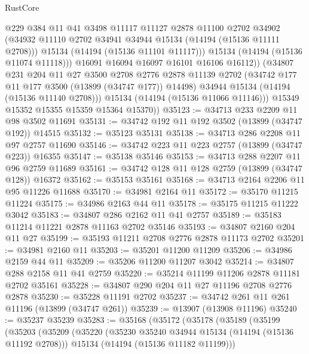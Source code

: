 \begin{lexlean}{RustCore}
\begin{coremodule}
                  @229
                  @384
                  @11
                  @41
                  @3498
                  @11117
                  @11127
                  @2878
                  @11100
                  @2702
                  @34902
                  (@34932 @11110 @2702 @34941 @34944 @15134 (@14194 (@15136 @11111 @2708)))
                  @15134
                  (@14194 (@15136 @11101 @11117)))
                @15134
                (@14194 (@15136 @11074 @11118)))
              @16091
              @16094
              @16097
              @16101
              @16106
              @16112))
          (@34807
            @231
            @204
            @11
            @27
            @3500
            @2708
            @2776
            @2878
            @11139
            @2702
            (@34742 @177 @11 @177 @3500 (@13899 (@34747 @177)) @14498)
            @34944
            @15134
            (@14194 (@15136 @11140 @2708)))
          @15134
          (@14194 (@15136 @11066 @11146)))
        @15349
        @15352
        @15355
        @15359
        @15364
        @15370))
@35123 := @34713 @233 @2209 @11 @98 @3502 @11691
@35131 := @34742 @192 @11 @192 @3502 (@13899 (@34747 @192)) @14515
@35132 := @35123 @35131
@35138 := @34713 @286 @2208 @11 @97 @2757 @11690
@35146 := @34742 @223 @11 @223 @2757 (@13899 (@34747 @223)) @16355
@35147 := @35138 @35146
@35153 := @34713 @288 @2207 @11 @96 @2759 @11689
@35161 := @34742 @128 @11 @128 @2759 (@13899 (@34747 @128)) @16372
@35162 := @35153 @35161
@35168 := @34713 @2164 @2206 @11 @95 @11226 @11688
@35170 := @34981 @2164 @11
@35172 := @35170 @11215 @11224
@35175 := @34986 @2163 @44 @11
@35178 := @35175 @11215 @11222 @3042
@35183 := @34807 @286 @2162 @11 @41 @2757
@35189 := @35183 @11214 @11221 @2878 @11163 @2702 @35146
@35193 := @34807 @2160 @204 @11 @27
@35199 := @35193 @11211 @2708 @2776 @2878 @11173 @2702
@35201 := @34981 @2160 @11
@35203 := @35201 @11200 @11209
@35206 := @34986 @2159 @44 @11
@35209 := @35206 @11200 @11207 @3042
@35214 := @34807 @288 @2158 @11 @41 @2759
@35220 := @35214 @11199 @11206 @2878 @11181 @2702 @35161
@35228 := @34807 @290 @204 @11 @27 @11196 @2708 @2776 @2878
@35230 := @35228 @11191 @2702
@35237 := @34742 @261 @11 @261 @11196 (@13899 (@34747 @261))
@35239 := @13907 (@13908 @11196)
@35240 := @35237 @35239
@35283 := @35168
    (@35172
      (@35178
        (@35189
          (@35199
            (@35203
              (@35209
                (@35220
                  (@35230 @35240 @34944 @15134 (@14194 (@15136 @11192 @2708)))
                  @15134
                  (@14194 (@15136 @11182 @11199)))

\end{coremodule}
\end{lexlean}
